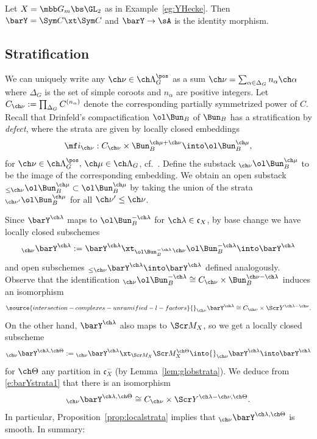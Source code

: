 \begin{eg}
\notready \label{eg:Heckecompact}
Let $X = \mbb G_m \bs \GL_2$ as in Example~\ref{eg:YHecke}.
Then $\barY = \Sym C \xt \Sym C$ and $\barY \to \sA$ is the identity morphism.
\end{eg}

\subsection{Stratification}
\label{sect:strat-compactified}
We can uniquely write any $\ch\nu \in \ch\Lambda^\pos_G$
as a sum $\ch\nu = \sum_{\alpha\in \Delta_G} n_\alpha \ch\alpha$ where $\Delta_G$ is the set of
simple coroots and $n_\alpha$ are positive integers.
Let $C_{\ch\nu} := \prod_{\Delta_G} C^{(n_\alpha)}$ denote the corresponding partially
symmetrized power of $C$.
Recall that Drinfeld's
compactification $\ol\Bun_B$ of $\Bun_B$ has a
stratification by \emph{defect}, where the strata are given by
locally closed embeddings
\[ \mf i_{\ch\nu}: C_{\ch\nu} \times \Bun^{\ch\mu+\ch\nu}_B \into \ol\Bun^{\ch\mu}_B, \]
for $\ch\nu\in \ch\Lambda^\pos_G,\, \ch\mu \in \ch\Lambda_G$, cf.~\cite[\S 1.5, p.~7]{BFGM}.
Define the substack ${_{\ch\nu}}\ol\Bun_B^{\ch\mu}$ to be the image
of the corresponding embedding.
We obtain an open substack $_{\le \ch\nu}\ol\Bun_B^{\ch\mu} \subset \ol\Bun^{\ch\mu}_B$ by taking the union of the strata $_{\ch\nu'}\ol\Bun_B^{\ch\mu}$
for all $\ch\nu' \le \ch\nu$.

Since $\barY^{\ch\lambda}$ maps to $\ol\Bun_B^{-\ch\lambda}$ for $\ch\lambda \in \mathfrak c_X$, by base change we have locally
closed subschemes
\[ {}_{\ch\nu} \barY^{\ch\lambda} := \barY^{\ch\lambda} \xt_{\ol\Bun_B^{-\ch\lambda}} {}_{\ch\nu} \ol\Bun_B^{-\ch\lambda} \into \barY^{\ch\lambda} \]
and open subschemes ${}_{\le \ch\nu} \barY^{\ch\lambda} \into \barY^{\ch\lambda}$ defined analogously.
Observe that the identification ${}_{\ch\nu} \ol\Bun_B^{-\ch\lambda} \cong
C_{\ch\nu} \times \Bun_B^{\ch\nu-\ch\lambda}$ induces an isomorphism
\begin{equation} \label{e:barYstrata1}
\source{intersection-complexes-unramified-l-factors}
    {}_{\ch\nu} \barY^{\ch\lambda}  \cong C_{\ch\nu} \times \Scr Y^{\ch\lambda-\ch\nu}.
\end{equation}
On the other hand, $\barY^{\ch\lambda}$ also maps to $\Scr M_X$, so
we get a locally closed subscheme
\[ {}_{\ch\nu}\barY^{\ch\lambda,\ch\Theta} := {}_{\ch\nu}\barY^{\ch\lambda} \xt_{\Scr M_X} \Scr M_X^{\ch\Theta} \into {}_{\ch\nu}\barY^{\ch\lambda} \into \barY^{\ch\lambda} \]
for $\ch\Theta$ any partition in $\mathfrak c_X^-$
(by Lemma~\ref{lem:globstrata}).
We deduce from \eqref{e:barYstrata1} that there is an isomorphism
\[ {}_{\ch\nu} \barY^{\ch\lambda,\ch\Theta} \cong C_{\ch\nu} \times \Scr Y^{\ch\lambda-\ch\nu, \ch\Theta}. \]
In particular, Proposition~\ref{prop:localstrata} implies that
${}_{\ch\nu} \barY^{\ch\lambda,\ch\Theta}$ is smooth.
In summary:

